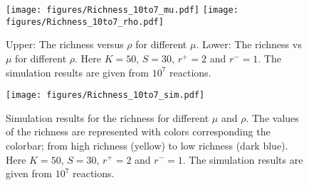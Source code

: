\documentclass[%
 amsmath,amssymb,
 reprint,%
]{revtex4-2}
\begin{document}
   \begin{figure}
        \centering
        \texttt{[image: figures/Richness\_10to7\_mu.pdf]}
        \texttt{[image: figures/Richness\_10to7\_rho.pdf]}
        \caption{Upper: The richness versus $\rho$ for different $\mu$. Lower: The richness vs $\mu$ for different $\rho$.  Here $K=50$, $S=30$, $r^+=2$ and $r^-=1$. The simulation results are given from $10^7$ reactions.}
        \label{fig:Richness_mu}
    \end{figure}
    
    \begin{figure}
        \centering
        \texttt{[image: figures/Richness\_10to7\_sim.pdf]}
        \caption{Simulation results for the richness for different $\mu$ and $\rho$. The values of the richness are represented with colors corresponding the colorbar; from high richness (yellow) to low richness (dark blue).  Here $K=50$, $S=30$, $r^+=2$ and $r^-=1$. The simulation results are given from $10^7$ reactions.   }
        \label{fig:Richness_heatMap_sim}
    \end{figure}
    
    \fi
    
    
\end{document}
